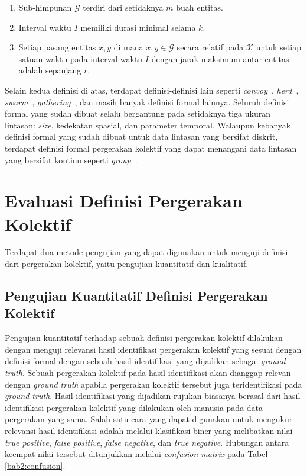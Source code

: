 \begin{itemize}
    \begin{enumerate}
        \item Sub-himpunan $\mathcal{G}$ terdiri dari setidaknya $m$ buah entitas.
        \item Interval waktu $I$ memiliki durasi minimal selama $k$.
        \item Setiap pasang entitas $x, y$ di mana $x, y \in \mathcal{G}$ secara relatif pada $\mathcal{X}$ untuk setiap satuan waktu pada interval waktu $I$ dengan jarak maksimum antar entitas adalah sepanjang $r$.
    \end{enumerate}
\end{itemize}

Selain kedua definisi di atas, terdapat definisi-definisi lain seperti \textit{convoy}~\cite{jeung:convoys}, \textit{herd}~\cite{huang:02:herd}, \textit{swarm}~\cite{li:swarm}, \textit{gathering}~\cite{zheng:02:gatherings}, dan masih banyak definisi formal lainnya. Seluruh definisi formal yang sudah dibuat selalu bergantung pada setidaknya tiga ukuran lintasan: \textit{size}, kedekatan spasial, dan parameter temporal. Walaupun kebanyak definisi formal yang sudah dibuat untuk data lintasan yang bersifat diskrit, terdapat definisi formal pergerakan kolektif yang dapat menangani data lintasan yang bersifat kontinu seperti \textit{group}~\cite{buchin:group}.

\section{Evaluasi Definisi Pergerakan Kolektif}
\label{sec:eval-theory}

Terdapat dua metode pengujian yang dapat digunakan untuk menguji definisi dari pergerakan kolektif, yaitu pengujian kuantitatif dan kualitatif.

\subsection{Pengujian Kuantitatif Definisi Pergerakan Kolektif}
\label{subsec:quantitative-theory}

Pengujian kuantitatif terhadap sebuah definisi pergerakan kolektif dilakukan dengan menguji relevansi hasil identifikasi pergerakan kolektif yang sesuai dengan definisi formal dengan sebuah hasil identifikasi yang dijadikan sebagai \textit{ground truth}. Sebuah pergerakan kolektif pada hasil identifikasi akan dianggap relevan dengan \textit{ground truth} apabila pergerakan kolektif tersebut juga teridentifikasi pada \textit{ground truth}. Hasil identifikasi yang dijadikan rujukan biasanya berasal dari hasil identifikasi pergerakan kolektif yang dilakukan oleh manusia pada data pergerakan yang sama. Salah satu cara yang dapat digunakan untuk mengukur relevansi hasil identifikasi adalah melalui klasifikasi biner yang melibatkan nilai \textit{true positive}, \textit{false positive}, \textit{false negative}, dan \textit{true negative}. Hubungan antara keempat nilai tersebut ditunjukkan melalui \textit{confusion matrix} pada Tabel \ref{bab2:confusion}.

